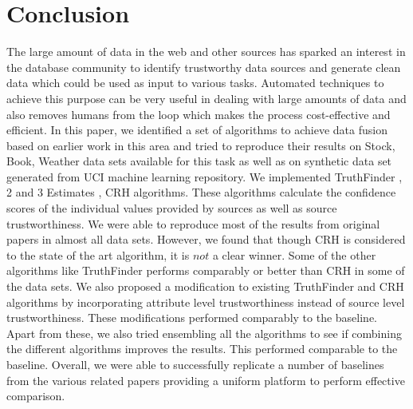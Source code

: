 \documentclass{acm_proc_article-sp}
\begin{document}
\section{Conclusion}
The large amount of data in the web and other sources has sparked an interest in the database community to identify trustworthy data sources and generate clean data which could be used as input to various tasks. Automated techniques to achieve this purpose can be very useful in dealing with large amounts of data and also removes humans from the loop  which makes the process cost-effective and efficient.  In this paper, we identified a set of algorithms to achieve data fusion based on earlier work in this area and tried to reproduce their results on Stock, Book, Weather data sets available for this task as well as on synthetic data set generated from UCI machine learning repository. We implemented {\sc TruthFinder} \cite{yin:truth}, 2 and 3 {\sc Estimates }\cite{galland:corro},  CRH  \cite{li:resolving} algorithms. These algorithms calculate the confidence scores of the individual values provided by sources as well as source trustworthiness. We were able to reproduce most of the results from original papers in almost all data sets. However, we found that though {\sc CRH} is considered to the state of the art algorithm, it is $not$ a clear winner. Some of the other algorithms like {\sc TruthFinder} performs comparably or better than CRH in some of the data sets. We also proposed a modification to existing {\sc TruthFinder} and {\sc CRH} algorithms by incorporating attribute level trustworthiness instead of source level trustworthiness. These modifications performed comparably to the baseline. Apart from these, we also tried ensembling all the algorithms to see if combining the different algorithms improves the results. This performed comparable to the baseline. Overall, we were able to successfully replicate a number of baselines from the various related papers providing a uniform platform to perform effective comparison.   



  

\balancecolumns
\end{document}
